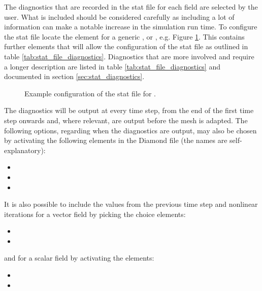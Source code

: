 The diagnostics that are recorded in the stat file for each field are selected by the user.  What is included should be considered carefully as including a lot of information can make a notable increase in the simulation run time. To configure the stat file locate the  element for a generic ,  or , e.g. Figure \ref{fig:diamond_enable_stat}. This contains further elements that will allow the configuration of the stat file as outlined in table \ref{tab:stat_file_diagnostics}. Diagnostics that are more involved and require a longer description are listed in table \ref{tab:stat_file_diagnostics} and documented in section \ref{sec:stat_diagnostics}.

\begin{figure}[ht]
  \centering
  \caption{Example configuration of the stat file for .}
  \label{fig:diamond_enable_stat}
\end{figure}

The diagnostics will be output at every time step, from the end of the first time step onwards and, where relevant, are output before the mesh is adapted. The following options, regarding when the diagnostics are output, may also be chosen by activating the following elements in the Diamond file (the names are self-explanatory):
\begin{itemize}
\item {}
\item {}
\item {}
\end{itemize}

It is also possible to include the values from the previous time step and nonlinear iterations for a vector field by picking the choice elements:
\begin{itemize}
\item {}
\item {}
\end{itemize}

and for a scalar field by activating the elements:

\begin{itemize}
\item {}
\item {}
\end{itemize}

